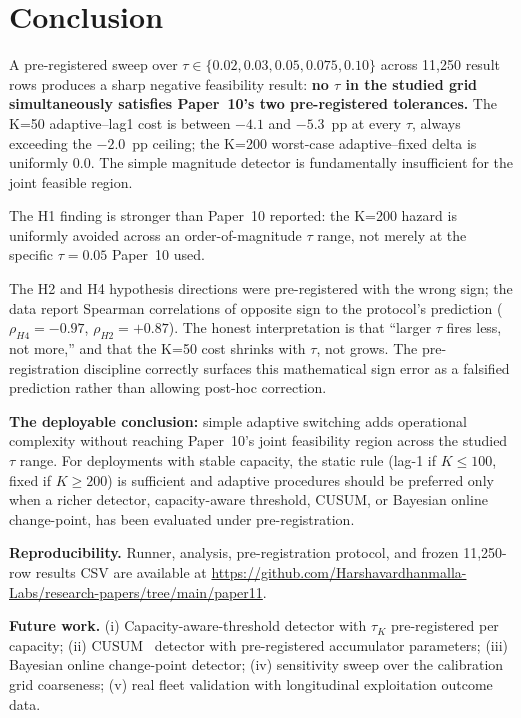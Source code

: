 \section{Conclusion}
\label{sec:conclusion}

A pre-registered sweep over $\tau \in \{0.02, 0.03, 0.05, 0.075,
0.10\}$ across 11{,}250 result rows produces a sharp negative
feasibility result: \textbf{no $\tau$ in the studied grid
simultaneously satisfies Paper~10's two pre-registered tolerances.}
The K=50 adaptive--lag1 cost is between $-4.1$ and $-5.3$~pp at
every $\tau$, always exceeding the $-2.0$~pp ceiling; the K=200
worst-case adaptive--fixed delta is uniformly $0.0$. The simple
magnitude detector is fundamentally insufficient for the joint
feasible region.

The H1 finding is stronger than Paper~10 reported: the K=200
hazard is uniformly avoided across an order-of-magnitude $\tau$
range, not merely at the specific $\tau = 0.05$ Paper~10 used.

The H2 and H4 hypothesis directions were pre-registered with the
wrong sign; the data report Spearman correlations of opposite sign
to the protocol's prediction ($\rho_{H4} = -0.97$, $\rho_{H2} =
+0.87$). The honest interpretation is that ``larger $\tau$ fires
less, not more,'' and that the K=50 cost shrinks with $\tau$, not
grows. The pre-registration discipline correctly surfaces this
mathematical sign error as a falsified prediction rather than
allowing post-hoc correction.

\textbf{The deployable conclusion:} simple adaptive switching adds
operational complexity without reaching Paper~10's joint feasibility
region across the studied $\tau$ range. For deployments with stable
capacity, the static rule (lag-1 if $K \leq 100$, fixed if
$K \geq 200$) is sufficient and adaptive procedures should be
preferred only when a richer detector, capacity-aware
threshold, CUSUM, or Bayesian online change-point, has been
evaluated under pre-registration.

\textbf{Reproducibility.} Runner, analysis, pre-registration protocol,
and frozen 11{,}250-row results CSV are available at
\url{https://github.com/Harshavardhanmalla-Labs/research-papers/tree/main/paper11}.

\textbf{Future work.} (i) Capacity-aware-threshold detector with
$\tau_K$ pre-registered per capacity; (ii) CUSUM~\cite{page1954cusum}
detector with pre-registered accumulator parameters; (iii) Bayesian
online change-point detector; (iv) sensitivity sweep over the
calibration grid coarseness; (v) real fleet validation with
longitudinal exploitation outcome data.
